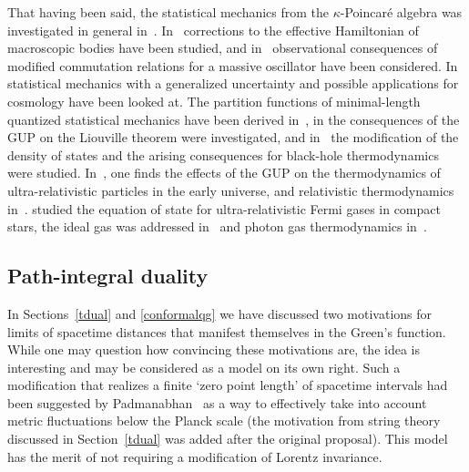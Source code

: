 \documentclass{article}
\begin{document}
That having been said, the statistical mechanics from the $\kappa$-Poincar\'e algebra was investigated
in general in~\cite{KowalskiGlikman:2001ct,Fityo:2008zz}. In~\cite{Quesne:2009vc} 
corrections to the effective Hamiltonian of macroscopic bodies have been studied, and 
in~\cite{Pikovski:2011zk} observational consequences of modified commutation relations for a massive oscillator have been considered. 
In
\cite{KalyanaRama:2001xd} statistical mechanics with a generalized uncertainty and possible
applications for cosmology have been looked at. The
partition functions of minimal-length quantized statistical mechanics have been derived in~\cite{Pedram:2011aa}, in
\cite{Ali:2011ap} the consequences of the GUP on the Liouville theorem were investigated,
and in~\cite{Chang:2001bm} the modification of the density of states and the arising
consequences for black-hole thermodynamics were studied. In~\cite{Nozari:2006gg}, one finds 
 the effects of the {\sc GUP} on the thermodynamics of ultra-relativistic particles in the early universe,
and relativistic thermodynamics in~\cite{Das:2009qb}. \cite{Wang:2011iv} studied the 
equation of state for ultra-relativistic Fermi gases in compact stars, the ideal gas
was addressed in~\cite{Chandra:2011nj} and photon gas
thermodynamics in~\cite{Zhang:2011ms}. 

\subsection{Path-integral duality}
\label{pathint}

In Sections~\ref{tdual} and \ref{conformalqg} we have discussed two motivations for limits
of spacetime distances that manifest themselves in the Green's function. While one may 
question how convincing these motivations are,  
the idea is interesting and may be considered as a model on its own right. 
Such a modification that realizes a finite `zero point length' of spacetime
intervals had been suggested by Padmanabhan~\cite{Padmanabhan:1986ny, Padmanabhan:1987au, Padmanabhan:1996ap, Padmanabhan:1998yya} as a way to effectively take into account
metric fluctuations below the Planck scale (the motivation from string theory discussed in Section~\ref{tdual} was added after
the original proposal). This model has the merit of not requiring a modification of Lorentz invariance.
\end{document}
